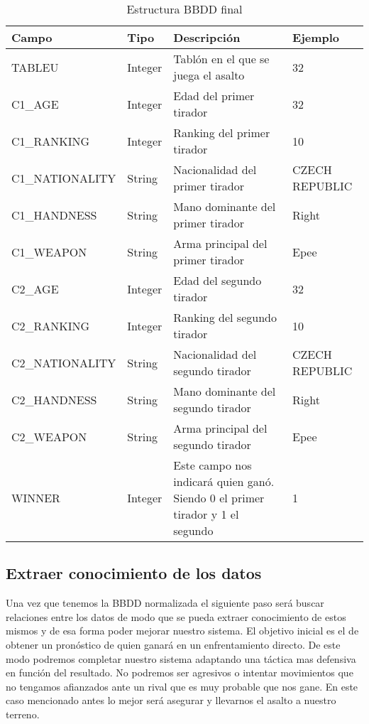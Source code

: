 \begin{longtable}{|p{3cm}p{2cm}p{6cm}p{3cm}|}
  \caption{Estructura \acs{BBDD} final}
  \label{tab:Estructura BBDD final postproceso}
  \endfirsthead
  \endhead
  \hline \rowcolor[HTML]{C0C0C0}
  Campo & Tipo & Descripción & Ejemplo \\ \hline
  TABLEU & Integer & Tablón en el que se juega el asalto & 32 \\ \hline

  \rowcolor[HTML]{969696}
  C1\_AGE & Integer & Edad del primer tirador & 32 \\ \hline
  \rowcolor[HTML]{969696}
  C1\_RANKING & Integer & Ranking del primer tirador & 10 \\ \hline
  \rowcolor[HTML]{969696}
  C1\_NATIONALITY & String & Nacionalidad del primer tirador & CZECH REPUBLIC \\ \hline
  \rowcolor[HTML]{969696}
  C1\_HANDNESS & String & Mano dominante del primer tirador & Right \\ \hline
  \rowcolor[HTML]{969696}
  C1\_WEAPON & String & Arma principal del primer tirador & Epee \\ \hline

  \rowcolor[HTML]{e3e3e3}
  C2\_AGE & Integer & Edad del segundo tirador & 32 \\ \hline
  \rowcolor[HTML]{e3e3e3}
  C2\_RANKING & Integer & Ranking del segundo tirador & 10 \\ \hline
  \rowcolor[HTML]{e3e3e3}
  C2\_NATIONALITY & String & Nacionalidad del segundo tirador & CZECH REPUBLIC \\ \hline
  \rowcolor[HTML]{e3e3e3}
  C2\_HANDNESS & String & Mano dominante del segundo tirador & Right \\ \hline
  \rowcolor[HTML]{e3e3e3}
  C2\_WEAPON & String & Arma principal del segundo tirador & Epee \\ \hline
  
  WINNER & Integer & Este campo nos indicará quien ganó. Siendo 0 el primer tirador y 1 el segundo & 1 \\ \hline
\end{longtable}

\subsection{Extraer conocimiento de los datos}

Una vez que tenemos la \acs{BBDD} normalizada el siguiente paso será buscar relaciones
entre los datos de modo que se pueda extraer conocimiento de estos mismos y de
esa forma poder mejorar nuestro sistema. El objetivo inicial es el de obtener
un pronóstico de quien ganará en un enfrentamiento directo. De este modo podremos
completar nuestro sistema adaptando una táctica mas defensiva en función
del resultado. No podremos ser agresivos o intentar movimientos que no tengamos afianzados
ante un rival que es muy probable que nos gane. En este caso mencionado antes lo mejor
será asegurar y llevarnos el asalto a nuestro terreno.

